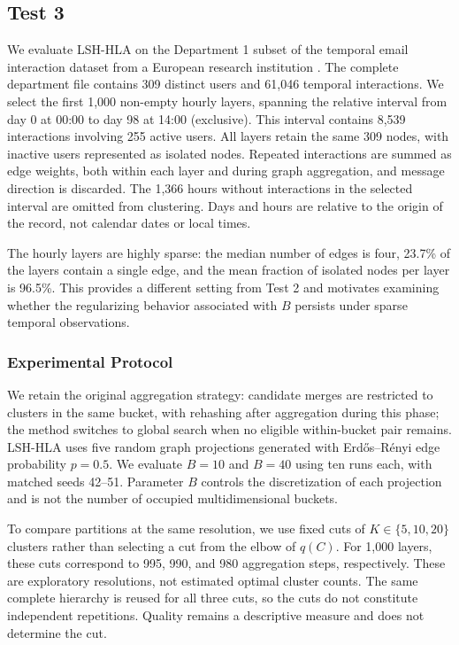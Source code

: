 \subsection{Test 3}
\label{sec:test3}

We evaluate LSH-HLA on the Department 1 subset of the temporal email interaction dataset from a European research institution \citep{tempnetworkdata}. The complete department file contains 309 distinct users and 61,046 temporal interactions. We select the first 1,000 non-empty hourly layers, spanning the relative interval from day 0 at 00:00 to day 98 at 14:00 (exclusive). This interval contains 8,539 interactions involving 255 active users. All layers retain the same 309 nodes, with inactive users represented as isolated nodes. Repeated interactions are summed as edge weights, both within each layer and during graph aggregation, and message direction is discarded. The 1,366 hours without interactions in the selected interval are omitted from clustering. Days and hours are relative to the origin of the record, not calendar dates or local times.

The hourly layers are highly sparse: the median number of edges is four, 23.7\% of the layers contain a single edge, and the mean fraction of isolated nodes per layer is 96.5\%. This provides a different setting from Test 2 and motivates examining whether the regularizing behavior associated with $B$ persists under sparse temporal observations.

\subsubsection*{Experimental Protocol}
We retain the original aggregation strategy: candidate merges are restricted to clusters in the same bucket, with rehashing after aggregation during this phase; the method switches to global search when no eligible within-bucket pair remains. LSH-HLA uses five random graph projections generated with Erd\H{o}s--R\'enyi edge probability $p=0.5$. We evaluate $B=10$ and $B=40$ using ten runs each, with matched seeds 42--51. Parameter $B$ controls the discretization of each projection and is not the number of occupied multidimensional buckets.

To compare partitions at the same resolution, we use fixed cuts of $K\in\{5,10,20\}$ clusters rather than selecting a cut from the elbow of $q(C)$. For 1,000 layers, these cuts correspond to 995, 990, and 980 aggregation steps, respectively. These are exploratory resolutions, not estimated optimal cluster counts. The same complete hierarchy is reused for all three cuts, so the cuts do not constitute independent repetitions. Quality remains a descriptive measure and does not determine the cut.

